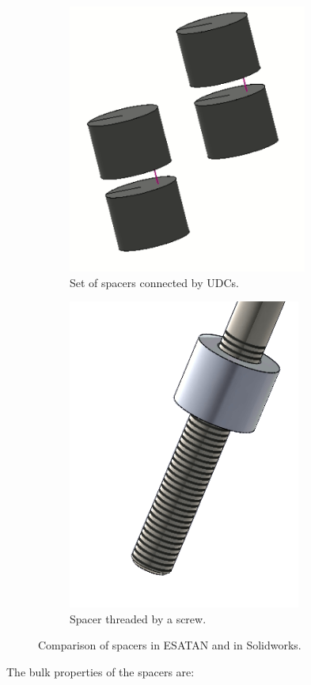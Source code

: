 \begin{figure}[H]
  \centering
  \begin{subfigure}{.5\textwidth}
    \centering
    \includegraphics[width=.5\linewidth]{res/img/5_simulationanalisys/Comparisons/ESATAN/spacers.PNG}
    \caption{Set of spacers connected by UDCs.}
    \label{fig:spacersudc}
  \end{subfigure}%
  \begin{subfigure}{.5\textwidth}
    \centering
    \includegraphics[width=.4\linewidth]{res/img/5_simulationanalisys/Comparisons/SLDW/spacercrossing_Solid.PNG}
    \caption{Spacer threaded by a screw.}
    \label{fig:spacersthread}
  \end{subfigure}
  \caption{Comparison of spacers in ESATAN and in Solidworks.}
  \label{fig:spacerssec5im}
\end{figure}

The bulk properties of the spacers are:

